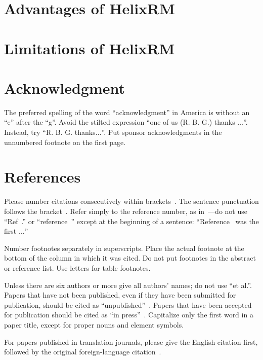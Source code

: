 \documentclass[conference]{IEEEtran}
\begin{document}





\section{Advantages of HelixRM}\label{sec:advantages-of-helixrm}


\section{Limitations of HelixRM}\label{sec:limitations-of-helixrm}



\section{Acknowledgment}\label{sec:acknowledgment}
The preferred spelling of the word ``acknowledgment'' in America is without
an ``e'' after the ``g''.
Avoid the stilted expression ``one of us (R. B\@.
G.) thanks $\ldots$''.
Instead, try ``R. B. G. thanks$\ldots$''.
Put sponsor acknowledgments in the unnumbered footnote on the first page.

\section*{References}

Please number citations consecutively within brackets~\cite{b1}.
The sentence punctuation follows the bracket~\cite{b2}.
Refer simply to the reference number, as in~\cite{b3}---do not use ``Ref~\cite{b3}.'' or ``reference~\cite{b3}'' except at
the beginning of a sentence: ``Reference~\cite{b3} was the first $\ldots$''

Number footnotes separately in superscripts.
Place the actual footnote at the bottom of the column in which it was cited.
Do not put footnotes in the abstract or reference list.
Use letters for table footnotes.

Unless there are six authors or more give all authors' names; do not use
``et al.''.
Papers that have not been published, even if they have been
submitted for publication, should be cited as ``unpublished''~\cite{b4}.
Papers that have been accepted for publication should be cited as ``in press''~\cite{b5}.
Capitalize only the first word in a paper title, except for proper nouns and
element symbols.

For papers published in translation journals, please give the English
citation first, followed by the original foreign-language citation~\cite{b6}.


%


\end{document}
